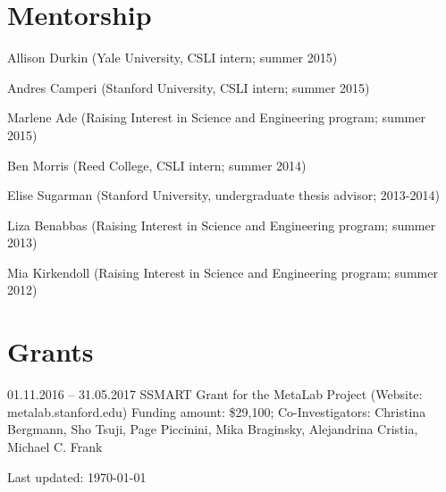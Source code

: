 \documentclass[letterpaper]{article}
\def\footerlink{}
\renewenvironment{itemize}{
  \begin{list}{}{
    \setlength{\leftmargin}{1.5em}
  }
}{
  \end{list}
}
\begin{document}
\section*{Mentorship}
\begin{itemize}
\item Allison Durkin (Yale University, CSLI intern; summer 2015)
\item Andres Camperi (Stanford University, CSLI intern; summer 2015)
\item Marlene Ade (Raising Interest in Science and Engineering program; summer 2015)
\item Ben Morris (Reed College, CSLI intern; summer 2014)
\item Elise Sugarman (Stanford University, undergraduate thesis advisor; 2013-2014)
\item Liza Benabbas (Raising Interest in Science and Engineering program; summer 2013)
\item Mia Kirkendoll (Raising Interest in Science and Engineering program; summer 2012)

\end{itemize}

\section*{Grants}
\begin{itemize}
\item 01.11.2016 -- 31.05.2017 SSMART Grant for the MetaLab Project (Website: metalab.stanford.edu) Funding amount: \$29,100; Co-Investigators: Christina Bergmann, Sho
Tsuji, Page Piccinini, Mika Braginsky, Alejandrina Cristia, Michael C. Frank
\end{itemize}



\bigskip

\begin{center}
  \begin{footnotesize}
    Last updated: \today \\
    \href{\footerlink}{\texttt{\footerlink}}
  \end{footnotesize}
\end{center}
\end{document}
